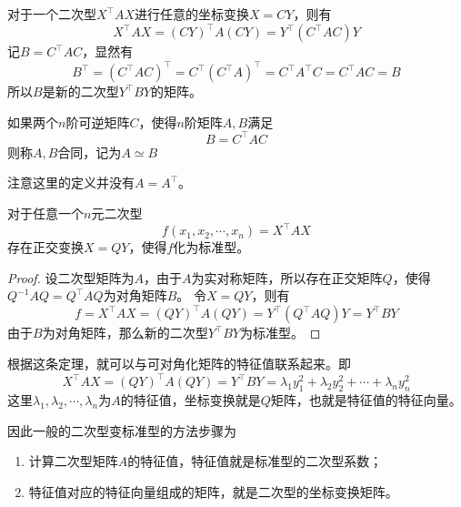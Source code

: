对于一个二次型$X^\intercal AX$进行任意的坐标变换$X=CY$，则有
\[ X^\intercal AX = (CY)^\intercal A (CY) = Y^\intercal (C^\intercal A C)Y \]
记$B=C^\intercal A C$，显然有
\[ B^\intercal = (C^\intercal A C)^\intercal = C^\intercal (C^\intercal A)^\intercal = C^\intercal A^\intercal C = C^\intercal AC = B \]
所以$B$是新的二次型$Y^\intercal BY$的矩阵。

\begin{definition}
    如果两个$n$阶可逆矩阵$C$，使得$n$阶矩阵$A,B$满足
    \[ B = C^\intercal AC \]
    则称$A,B$合同，记为$A\simeq B$
\end{definition}
注意这里的定义并没有$A=A^\intercal$。

\begin{theorem}
    对于任意一个$n$元二次型
    \[ f(x_1,x_2,\cdots,x_n) = X^\intercal AX \]
    存在正交变换$X=QY$，使得$f$化为标准型。
\end{theorem}
\begin{proof}
    设二次型矩阵为$A$，由于$A$为实对称矩阵，所以存在正交矩阵$Q$，使得$Q^{-1}AQ =  Q^\intercal AQ$为对角矩阵$B$。
    令$X=QY$，则有
    \[f = X^\intercal AX = (QY)^\intercal A (QY) = Y^\intercal (Q^\intercal AQ) Y = Y^\intercal BY\]
    由于$B$为对角矩阵，那么新的二次型$Y^\intercal B Y$为标准型。
\end{proof}

根据这条定理，就可以与可对角化矩阵的特征值联系起来。即
\begin{equation}
    X^\intercal AX = (QY)^\intercal A (QY) = Y^\intercal BY = \lambda_1y_1^2+\lambda_2y_2^2+\cdots+\lambda_ny_n^2
\end{equation}
这里$\lambda_1,\lambda_2,\cdots,\lambda_n$为$A$的特征值，坐标变换就是$Q$矩阵，也就是特征值的特征向量。

因此一般的二次型变标准型的方法步骤为
\begin{enumerate}
    \item 计算二次型矩阵$A$的特征值，特征值就是标准型的二次型系数；
    \item 特征值对应的特征向量组成的矩阵，就是二次型的坐标变换矩阵。
\end{enumerate}

